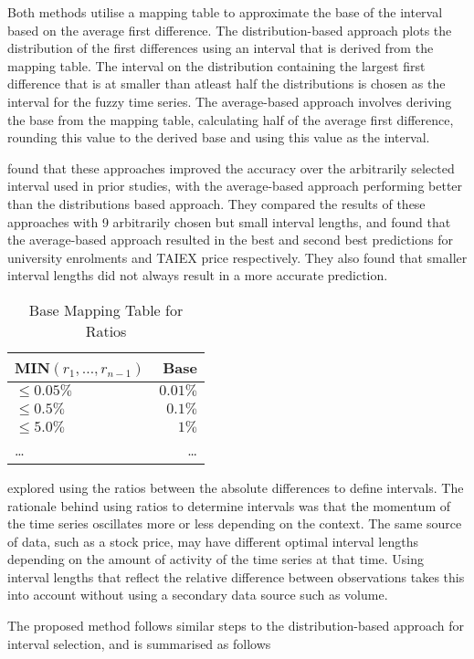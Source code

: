 \documentclass{article}
\theoremstyle{definition}
\begin{document}
Both methods utilise a mapping table to approximate the base of the interval based on the average first difference. The distribution-based approach plots the distribution of the first differences using an interval that is derived from the mapping table. The interval on the distribution containing the largest first difference that is at smaller than atleast half the distributions is chosen as the interval for the fuzzy time series. The average-based approach involves deriving the base from the mapping table, calculating half of the average first difference, rounding this value to the derived base and using this value as the interval.

\citep{Huarng2001effective} found that these approaches improved the accuracy over the arbitrarily selected interval used in prior studies, with the average-based approach performing better than the distributions based approach. They compared the results of these approaches with 9 arbitrarily chosen but small interval lengths, and found that the average-based approach resulted in the best and second best predictions for university enrolments and TAIEX price respectively. They also found that smaller interval lengths did not always result in a more accurate prediction.

\begin{table}[H]
	\center
	\begin{tabularx}{0.5\textwidth}{ X R }
  	MIN$(r_1,\ldots,r_{n-1})$ & Base\\
  	\hline 
  	\noalign{\smallskip}
	$\leq 0.05\%$ & $0.01\%$ \\
	$\leq 0.5\%$ & $0.1\%$ \\
	$\leq 5.0\%$ & $1\%$ \\
	\ldots & \ldots
	\end{tabularx}
	\caption{Base Mapping Table for Ratios}
\end{table}

\cite{huarng2006ratio} explored using the ratios between the absolute differences to define intervals. The rationale behind using ratios to determine intervals was that the momentum of the time series oscillates more or less depending on the context. The same source of data, such as a stock price, may have different optimal interval lengths depending on the amount of activity of the time series at that time. Using interval lengths that reflect the relative difference between observations takes this into account without using a secondary data source such as volume.

The proposed method follows similar steps to the distribution-based approach for interval selection, and is summarised as follows
\end{document}

